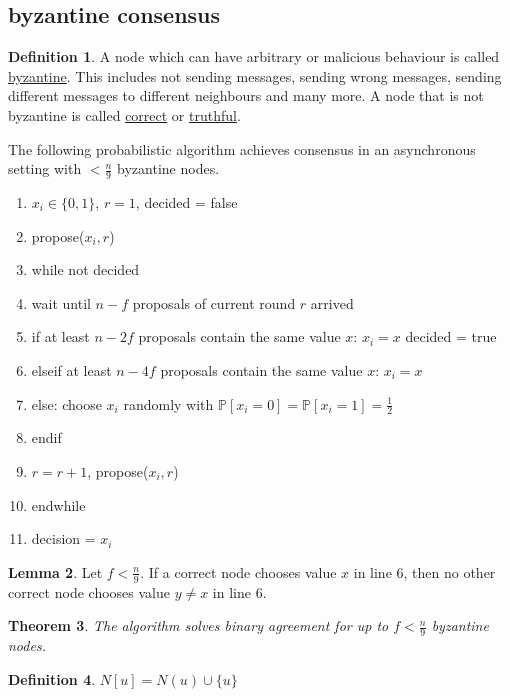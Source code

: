 \documentclass[a4paper, 12pt]{article}
\theoremstyle{plain}
\newtheorem{theorem}{Theorem}[section] %
\theoremstyle{definition}
\newtheorem{definition}[theorem]{Definition} %
\theoremstyle{lemma}
\newtheorem{lemma}[theorem]{Lemma}
\theoremstyle{remark}
\theoremstyle{corollary}
\theoremstyle{example}
\begin{document}
	\subsection{byzantine consensus}
	\begin{definition}
		A node which can have arbitrary or malicious behaviour is called \underline{byzantine}. This includes not sending messages, sending wrong messages, sending different messages to different neighbours and many more. A node that is not byzantine is called \underline{correct} or \underline{truthful}.
	\end{definition}
	The following probabilistic algorithm achieves consensus in an asynchronous setting with $<\frac{n}{9}$ byzantine nodes.
	\begin{enumerate}
		\item $x_i \in \{0,1\}$, $r = 1$, decided = false
		\item propose($x_i,r$)
		\item while not decided
		\item wait until $n-f$ proposals of current round $r$ arrived
		\item if at least $n-2f$ proposals contain the same value $x$: $x_i=x$ decided = true
		\item elseif at least $n-4f$ proposals contain the same value $x$: $x_i=x$
		\item else: choose $x_i$ randomly with $\mathbb{P}[x_i=0] = \mathbb{P}[x_i=1] = \frac{1}{2}$
		\item endif
		\item $r = r+1$, propose($x_i, r$)
		\item endwhile
		\item decision = $x_i$
	\end{enumerate}
	\begin{lemma}
		Let $f < \frac{n}{9}$. If a correct node chooses value $x$ in line 6, then no other correct node chooses value $y\neq x$ in line 6.
	\end{lemma}
	\begin{theorem}
		The algorithm solves binary agreement for up to $f<\frac{n}{9}$ byzantine nodes. 
	\end{theorem}
	\begin{definition}
		$N[u] = N(u) \cup \{u\}$
	\end{definition}
\end{document}
